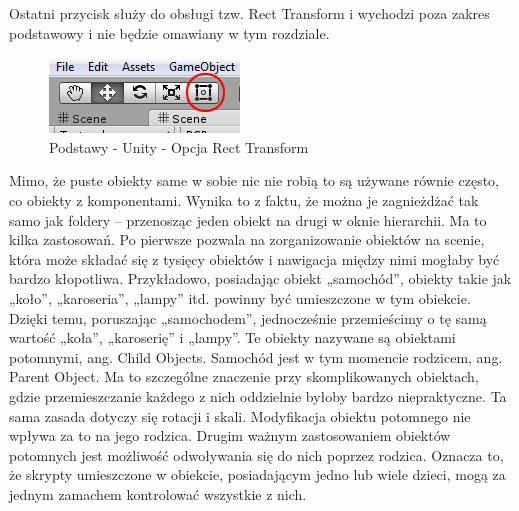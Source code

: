 \documentclass[openright]{xmgr}
\begin{document}
Ostatni przycisk służy do obsługi tzw. Rect Transform i wychodzi poza zakres podstawowy i nie będzie omawiany w tym rozdziale.

\begin{figure}[!htb]
    \begin{center}
    \includegraphics[scale=0.4]{Screeny/rodzial5screeny/recttrans_option}
    \end{center}
    \caption{Podstawy - Unity - Opcja Rect Transform }
\end{figure}

Mimo, że puste obiekty same w sobie nic nie robią to są używane równie często, co obiekty z komponentami. Wynika to z faktu, że można je zagnieżdżać tak samo jak foldery – przenosząc jeden obiekt na drugi w oknie hierarchii. Ma to kilka zastosowań. Po pierwsze pozwala na zorganizowanie obiektów na scenie, która może składać się z tysięcy obiektów i nawigacja między nimi mogłaby być bardzo kłopotliwa. Przykładowo, posiadając obiekt „samochód”, obiekty takie jak „koło”, „karoseria”, „lampy” itd. powinny być umieszczone w tym obiekcie. Dzięki temu, poruszając „samochodem”, jednocześnie przemieścimy o tę samą wartość „koła”, „karoserię” i „lampy”. Te obiekty nazywane są obiektami potomnymi, ang. Child Objects. Samochód jest w tym momencie rodzicem, ang. Parent Object. Ma to szczególne znaczenie przy skomplikowanych obiektach, gdzie przemieszczanie każdego z nich oddzielnie byłoby bardzo niepraktyczne. Ta sama zasada dotyczy się rotacji i skali. Modyfikacja obiektu potomnego nie wpływa za to na jego rodzica. Drugim ważnym zastosowaniem obiektów potomnych jest możliwość odwoływania się do nich poprzez rodzica. Oznacza to, że skrypty umieszczone w obiekcie, posiadającym jedno lub wiele dzieci, mogą za jednym zamachem kontrolować wszystkie z nich.
\end{document}
